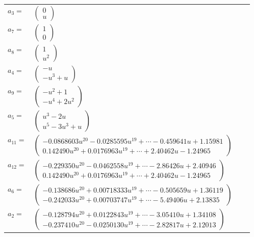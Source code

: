\documentclass[1p]{elsarticle_modified}
\theoremstyle{definition}
\begin{document}
\begin{tabular}{m{7pt} m{180pt} m{7pt} m{180pt} }
\flushright $a_{3}=$&$\begin{pmatrix}0\\u\end{pmatrix}$ \\
\flushright $a_{7}=$&$\begin{pmatrix}1\\0\end{pmatrix}$ \\
\flushright $a_{8}=$&$\begin{pmatrix}1\\u^2\end{pmatrix}$ \\
\flushright $a_{4}=$&$\begin{pmatrix}- u\\- u^3+u\end{pmatrix}$ \\
\flushright $a_{9}=$&$\begin{pmatrix}- u^2+1\\- u^4+2 u^2\end{pmatrix}$ \\
\flushright $a_{5}=$&$\begin{pmatrix}u^3-2 u\\u^5-3 u^3+u\end{pmatrix}$ \\
\flushright $a_{11}=$&$\begin{pmatrix}-0.0868603 u^{20}-0.0285595 u^{19}+\cdots-0.459641 u+1.15981\\0.142490 u^{20}+0.0176963 u^{19}+\cdots+2.40462 u-1.24965\end{pmatrix}$ \\
\flushright $a_{12}=$&$\begin{pmatrix}-0.229350 u^{20}-0.0462558 u^{19}+\cdots-2.86426 u+2.40946\\0.142490 u^{20}+0.0176963 u^{19}+\cdots+2.40462 u-1.24965\end{pmatrix}$ \\
\flushright $a_{6}=$&$\begin{pmatrix}-0.138686 u^{20}+0.00718333 u^{19}+\cdots-0.505659 u+1.36119\\-0.242033 u^{20}+0.00703747 u^{19}+\cdots-5.49406 u+2.13835\end{pmatrix}$ \\
\flushright $a_{2}=$&$\begin{pmatrix}-0.128794 u^{20}+0.0122843 u^{19}+\cdots-3.05410 u+1.34108\\-0.237410 u^{20}-0.0250130 u^{19}+\cdots-2.82817 u+2.12013\end{pmatrix}$ \\

\end{tabular}
\end{document}
